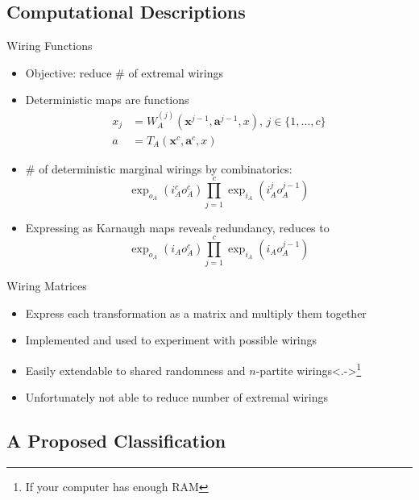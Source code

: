 \documentclass[xcolor=dvipsnames]{beamer}
\newcommand{\dintv}[2]{\mathopen\{#1,\ldots,#2\mathclose\}}
\newcommand{\?}{\mathrel{?}} %
\newcommand{\cvec}[1]{\boldsymbol{\mathbf{#1}}}    %
\begin{document}
\subsection{Computational Descriptions}

\begin{frame}{Wiring Functions}
  \begin{itemize}[<+->]
    \item Objective: reduce \(\#\) of extremal wirings
    \item Deterministic maps are functions
      \begin{align*}
        x_j &= W^{(j)}_{A}(\cvec{x}^{j-1}, \cvec{a}^{j-1}, x),\,j \in \dintv{1}{c} \\
          a &= T_{A}(\cvec{x}^{c}, \cvec{a}^{c}, x)
      \end{align*}
    \item \(\#\) of deterministic marginal wirings by combinatorics:
      \[ \exp_{o_A}(i_A^c o_A^c) \prod_{j=1}^c \exp_{i_A}(i_A^{j} o_A^{j-1}) \]
    \item Expressing as Karnaugh maps reveals redundancy, reduces to
      \[ \exp_{o_A}(i_A o_A^c) \prod_{j=1}^c \exp_{i_A}(i_A o_A^{j-1}) \]
  \end{itemize}
\end{frame}

\begin{frame}{Wiring Matrices}
  \begin{itemize}[<+->]
    \item Express each transformation as a matrix and multiply them together
    \item Implemented and used to experiment with possible wirings
    \item Easily extendable to shared randomness and \(n\)-partite wirings\only<.->{\footnote{If your computer has enough RAM}}
    \item Unfortunately not able to reduce number of extremal wirings
  \end{itemize}
\end{frame}

\subsection{A Proposed Classification}
\end{document}
